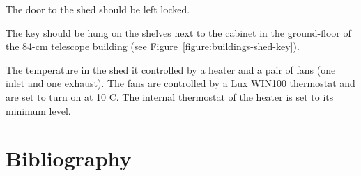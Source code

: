 The door to the shed should be left locked. 

The key should be hung on the shelves next to the cabinet in the ground-floor of the 84-cm telescope building (see Figure~\ref{figure:buildings-shed-key}).

The temperature in the shed it controlled by a heater and a pair of fans (one inlet and one exhaust). The fans are controlled by a Lux WIN100 thermostat and are set to turn on at 10 C. The internal thermostat of the heater is set to its minimum level.



\section{Bibliography}

